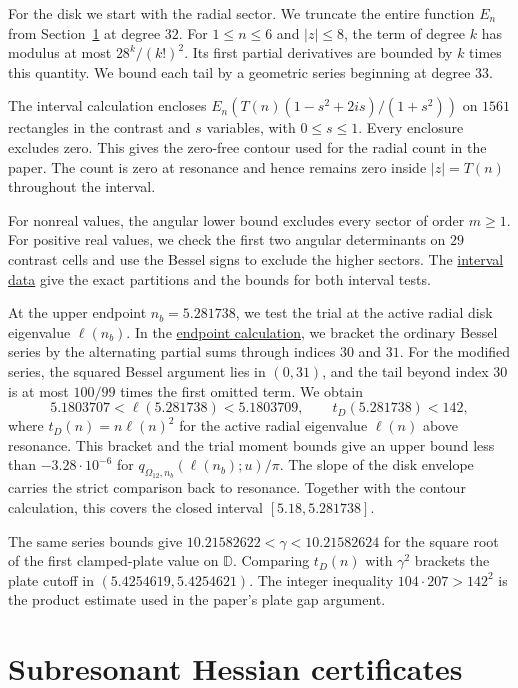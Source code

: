 \documentclass[a4paper,11pt]{amsart}
\newcommand{\repofile}[2]{\href{https://github.com/MColbrook/transmission-shape-optimisation/blob/main/#1}{#2}}
\numberwithin{equation}{section}
\theoremstyle{plain}
\theoremstyle{definition}
\newcommand{\D}{\mathbb D}
\begin{document}
For the disk we start with the radial sector. We truncate the
entire function \(E_n\) from Section~\ref{sup:hessian} at degree
\(32\). For \(1\le n\le6\) and \(|z|\le8\), the term of degree \(k\)
has modulus at most \(28^k/(k!)^2\). Its first partial derivatives
are bounded by \(k\) times this quantity. We bound each tail by
a geometric series beginning at degree \(33\).

The interval calculation encloses
\(E_n(T(n)(1-s^2+2is)/(1+s^2))\) on \(1561\) rectangles in the
contrast and \(s\) variables, with \(0\le s\le1\). Every enclosure
excludes zero. This gives the zero-free contour used for the radial
count in the paper. The count is zero at resonance and hence remains
zero inside \(|z|=T(n)\) throughout the interval.

For nonreal values, the angular lower bound excludes every sector
of order \(m\ge1\). For positive real values, we check the first
two angular determinants on \(29\) contrast cells and use the Bessel
signs to exclude the higher sectors. The
\repofile{certificates/continuation/certify_contrast_interval.json}{interval data}
give the exact partitions and the bounds for both interval tests.

At the upper endpoint \(n_b=5.281738\), we test the trial at the
active radial disk eigenvalue \(\ell(n_b)\). In the
\repofile{certificates/check_transition_endpoints.mjs}{endpoint calculation},
we bracket the ordinary Bessel series by the alternating partial
sums through indices \(30\) and \(31\). For the modified series,
the squared Bessel argument lies in \((0,31)\), and the tail beyond
index \(30\) is at most \(100/99\) times the first omitted term.
We obtain
\[
 5.1803707<\ell(5.281738)<5.1803709,\qquad
 t_D(5.281738)<142,
\]
where \(t_D(n)=n\ell(n)^2\) for the active radial eigenvalue
\(\ell(n)\) above resonance. This bracket and the trial moment
bounds give an upper bound less than \(-3.28\cdot 10^{-6}\) for
\(q_{\Omega_{12},n_b}(\ell(n_b);u)/\pi\). The slope of the disk
envelope carries the strict comparison back to resonance.
Together with the contour calculation, this covers the closed
interval \([5.18,5.281738]\).

The same series bounds give \(10.21582622<\gamma<10.21582624\)
for the square root of the first clamped-plate value on \(\D\).
Comparing \(t_D(n)\) with \(\gamma^2\) brackets the plate cutoff in
\((5.4254619,5.4254621)\). The integer inequality
\(104\cdot207>142^2\) is the product estimate used in the paper's
plate gap argument.

\section{Subresonant Hessian certificates}\label{sup:hessian}
\end{document}
